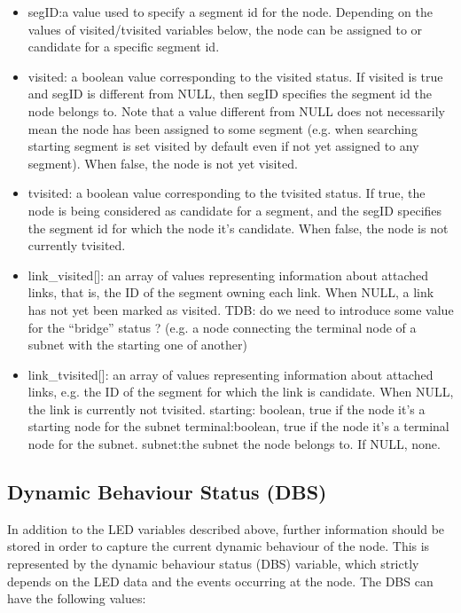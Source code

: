 \documentclass[final,journal,letterpaper]{IEEEtran}
\begin{document}
\begin{itemize}
\item{segID}:a value used to specify a segment id for the node. Depending on
the values of visited/tvisited variables below, the node can be
assigned to or candidate for a specific segment id.  
\item{visited}: a boolean value corresponding to the visited status. If visited is true
and segID is different from NULL, then segID specifies the segment id
the node belongs to. Note that a value different from NULL does not
necessarily mean the node has been assigned to some segment (e.g. when
searching starting segment is set visited by default even if not yet
assigned to any segment). When false, the node is not yet visited.
\item{tvisited}: a boolean value corresponding to the tvisited status. If
true, the node is being considered as candidate for a segment, and the
segID specifies the segment id for which the node it's candidate. When
false, the node is not currently tvisited.  
\item{link\_visited[]}: an array
of values representing information about attached links, that is, the
ID of the segment owning each link. When NULL, a link has not yet been
marked as visited. TDB: do we need to introduce some value for the
“bridge” status ? (e.g. a node connecting the terminal node of a
subnet with the starting one of another) 
\item{link\_tvisited[]}: an array of
values representing information about attached links, e.g. the ID of
the segment for which the link is candidate. When NULL, the link is
currently not tvisited.  starting: boolean, true if the node it's a
starting node for the subnet terminal:boolean, true if the node it's a
terminal node for the subnet.  subnet:the subnet the node belongs to.
If NULL, none.
\end{itemize}

\subsection{Dynamic Behaviour Status (DBS)}
In addition to the LED variables described above, further information
should be stored in order to capture the current dynamic behaviour of
the node. This is represented by the dynamic behaviour status (DBS)
variable, which strictly depends on the LED data and the events
occurring at the node. The DBS can have the following values:
\end{document}
